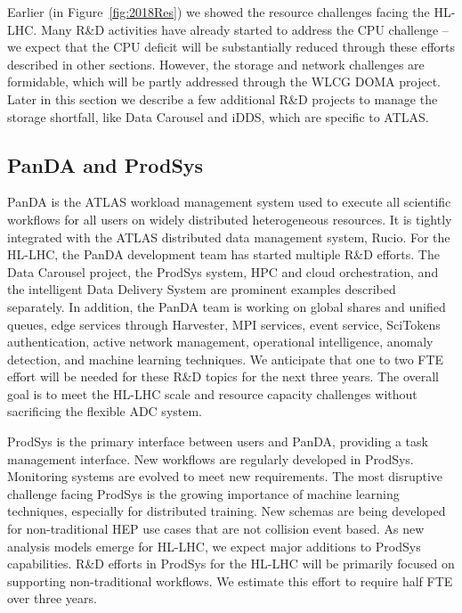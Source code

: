 Earlier (in Figure~\ref{fig:2018Res}) we showed the resource challenges facing the HL-LHC. Many R\&D activities have already started to address the CPU challenge -- we expect that the CPU deficit will be substantially reduced through these efforts described in other sections. However, the storage and network challenges are formidable, which will be partly addressed through the WLCG DOMA project. Later in this section we describe a few additional R\&D projects to manage the storage shortfall, like Data Carousel and iDDS, which are specific to ATLAS.


\subsection{PanDA and ProdSys}

PanDA is the ATLAS workload management system used to execute all scientific workflows for all users on widely distributed heterogeneous resources. It is tightly integrated with the ATLAS distributed data management system, Rucio. For the HL-LHC, the PanDA development team has started multiple R\&D efforts. The Data Carousel project, the ProdSys system, HPC and cloud orchestration, and the intelligent Data Delivery System are prominent examples described separately. In addition, the PanDA team is working on global shares and unified queues, edge services through Harvester, MPI services, event service, SciTokens authentication, active network management, operational intelligence, anomaly detection, and machine learning techniques. We anticipate that one to two FTE effort will be needed for these R\&D topics for the next three years. The overall goal is to meet the HL-LHC scale and resource capacity challenges without sacrificing the flexible ADC system.

ProdSys is the primary interface between users and PanDA, providing a task management interface. New workflows are regularly developed in ProdSys. Monitoring systems are evolved to meet new requirements. The most disruptive challenge facing ProdSys is the growing importance of machine learning techniques, especially for distributed training. New schemas are being developed for non-traditional HEP use cases that are not collision event based. As new analysis models emerge for HL-LHC, we expect major additions to ProdSys capabilities. R\&D efforts in ProdSys for the HL-LHC will be primarily focused on supporting non-traditional workflows. We estimate this effort to require half FTE over three years.


